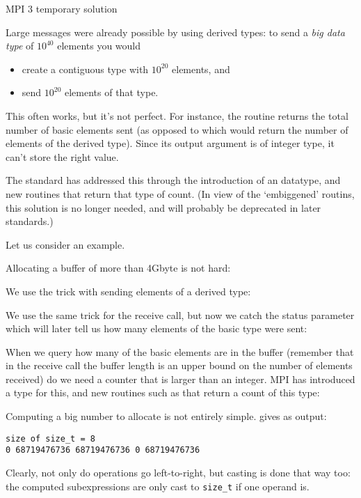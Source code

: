  {MPI 3 temporary solution}

Large messages were already possible by using 
derived types: to send
a \emph{big data type} of $10^{40}$ elements you would
\begin{itemize}
\item create a contiguous type with $10^{20}$ elements, and
\item send $10^{20}$ elements of that type.
\end{itemize}
This often works, but it's not perfect. For instance, the routine
 returns the total number of basic elements sent
(as opposed to  which would return the number
of elements of the derived type). Since its output argument is
of integer type, it can't store the right value.

The  standard has addressed this
through the introduction of an  datatype,
and new routines that return that type of count.
(In view of the `embiggened' routins, this solution
is no longer needed, and will probably be deprecated in later standards.)

Let us consider an example.

Allocating a buffer of more than 4Gbyte is not hard:

We use the trick with sending elements of a derived type:

We use the same trick for the receive call, but now we catch the status
parameter which will later tell us how many elements of the basic type
were sent:
%

When we query how many of the basic elements are in the buffer
(remember that in the receive call the buffer length is
an upper bound on the number of elements received)
do we
need a counter that is larger than an integer.  MPI has introduced a
type  for this, and new routines such as
 that return a
count of this type:


\begin{remark}
  Computing a big number to allocate is not entirely simple.
  gives as output:
\begin{verbatim}
size of size_t = 8
0 68719476736 68719476736 0 68719476736
\end{verbatim}
Clearly, not only do operations go left-to-right, but casting is done that way too:
the computed subexpressions are only cast to \lstinline{size_t} if one operand is.
\end{remark}

